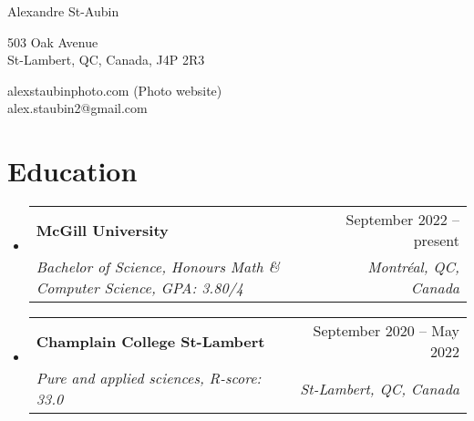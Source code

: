 \documentclass[letterpaper,11pt]{article}
\makeatletter
\newcommand{\resumeSubheading}[4]{
  \vspace{-2pt}\item
    \begin{tabular*}{0.97\textwidth}[t]{l@{\extracolsep{\fill}}r}
      \textbf{#1} & #2 \\
      \textit{\small #3} & \textit{\small #4} \\
    \end{tabular*}\vspace{-10pt}
}
\newcommand{\resumeSubHeadingListStart}{\begin{itemize}[leftmargin=0.15in, label={}]}
\newcommand{\resumeSubHeadingListEnd}{\end{itemize}}
\makeatother
\begin{document}
\begin{center}
    {\LARGE Alexandre St-Aubin} \\ \vspace{0pt}
    \begin{multicols}{2}
    \begin{flushleft}
    \large{503 Oak Avenue} \\
    \large{St-Lambert, QC, Canada, J4P 2R3} \\
    \end{flushleft}
    
    \begin{flushright}
    \href{alexstaubinphoto.com} \large{alexstaubinphoto.com (Photo website)} \\
    \href{mailto:{alex.staubin2@gmail.com}} \large{alex.staubin2@gmail.com}
    \end{flushright}
    \end{multicols}
\end{center}


\section{Education}
\resumeSubHeadingListStart

    \resumeSubheading
        {McGill University}{September 2022 -- present}
        {Bachelor of Science, Honours Math \& Computer Science, GPA: 3.80/4}{Montréal, QC, Canada}
      \resumeSubheading
        {Champlain College St-Lambert  }{September 2020 -- May 2022}
        {Pure and applied sciences, R-score: 33.0}{St-Lambert, QC, Canada}

\resumeSubHeadingListEnd


\end{document}
